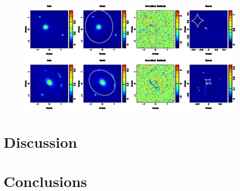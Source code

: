 \documentclass[a4paper,fleqn,usenatbib]{mnras}
\begin{document}
   \begin{figure}
\begin{center} 
\includegraphics[width = 16 cm]{fig6a.ps}
\includegraphics[width = 16 cm]{fig6b.ps}
\contcaption{}
\end{center}     
 \end{figure}


\section{Discussion}
\label{sec:disc}

\section{Conclusions}
\label{sec:conc}


%
\end{document}
